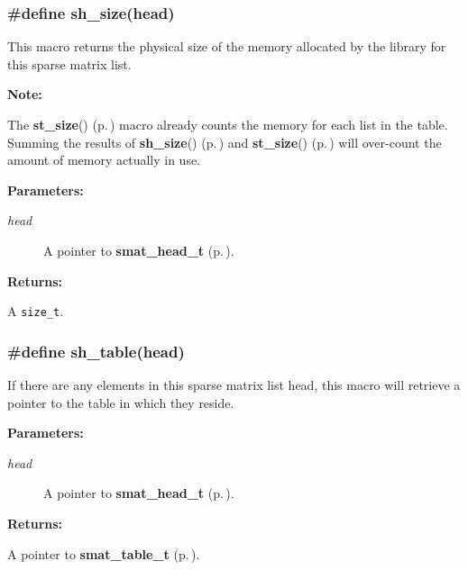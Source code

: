 \subsubsection{\setlength{\rightskip}{0pt plus 5cm}\#define sh\_\-size(head)}\label{group__dbprim__smat_a38}




 This macro returns the physical size of the memory allocated by the library for this sparse matrix list.

\begin{Desc}
\item[{\bf Note: }]\par
The {\bf st\_\-size}() {\rm (p.\,\pageref{group__dbprim__smat_a28})} macro already counts the memory for each list in the table. Summing the results of {\bf sh\_\-size}() {\rm (p.\,\pageref{group__dbprim__smat_a38})} and {\bf st\_\-size}() {\rm (p.\,\pageref{group__dbprim__smat_a28})} will over-count the amount of memory actually in use.\end{Desc}
\begin{Desc}
\item[{\bf Parameters: }]\par
\begin{description}
\item[
{\em head}]A pointer to {\bf smat\_\-head\_\-t} {\rm (p.\,\pageref{group__dbprim__smat_a1})}.

\end{description}
\end{Desc}
\begin{Desc}
\item[{\bf Returns: }]\par
A {\tt size\_\-t}. \end{Desc}
\subsubsection{\setlength{\rightskip}{0pt plus 5cm}\#define sh\_\-table(head)}\label{group__dbprim__smat_a32}




 If there are any elements in this sparse matrix list head, this macro will retrieve a pointer to the table in which they reside.\begin{Desc}
\item[{\bf Parameters: }]\par
\begin{description}
\item[
{\em head}]A pointer to {\bf smat\_\-head\_\-t} {\rm (p.\,\pageref{group__dbprim__smat_a1})}.

\end{description}
\end{Desc}
\begin{Desc}
\item[{\bf Returns: }]\par
A pointer to {\bf smat\_\-table\_\-t} {\rm (p.\,\pageref{group__dbprim__smat_a0})}. \end{Desc}
